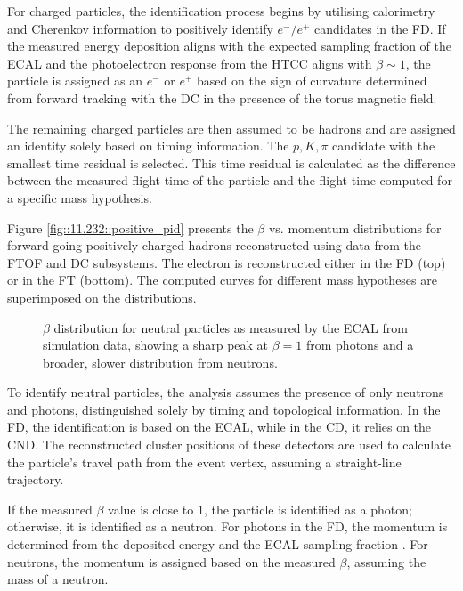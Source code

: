     For charged particles, the identification process begins by utilising calorimetry and Cherenkov information to positively identify $e^-/e^+$ candidates in the FD.
    If the measured energy deposition aligns with the expected sampling fraction of the ECAL and the photoelectron response from the HTCC aligns with $\beta \sim 1$, the particle is assigned as an $e^-$ or $e^+$ based on the sign of curvature determined from forward tracking with the DC in the presence of the torus magnetic field.

    The remaining charged particles are then assumed to be hadrons and are assigned an identity solely based on timing information.
    The $p, K, \pi$ candidate with the smallest time residual is selected.
    This time residual is calculated as the difference between the measured flight time of the particle and the flight time computed for a specific mass hypothesis.

    Figure \ref{fig::11.232::positive_pid} presents the $\beta$ vs. momentum distributions for forward-going positively charged hadrons reconstructed using data from the FTOF and DC subsystems.
    The electron is reconstructed either in the FD (top) or in the FT (bottom).
    The computed curves for different mass hypotheses are superimposed on the distributions.

    \begin{wrapfigure}{r}{0.50\textwidth}
        \caption[$\beta$ distribution of neutrals.]
        {$\beta$ distribution for neutral particles as measured by the ECAL from simulation data, showing a sharp peak at $\beta = 1$ from photons and a broader, slower distribution from neutrons.}
        \label{fig::11.232::neutrons_and_gamma}
    \end{wrapfigure}

    To identify neutral particles, the analysis assumes the presence of only neutrons and photons, distinguished solely by timing and topological information.
    In the FD, the identification is based on the ECAL, while in the CD, it relies on the CND.
    The reconstructed cluster positions of these detectors are used to calculate the particle's travel path from the event vertex, assuming a straight-line trajectory.

    If the measured $\beta$ value is close to $1$, the particle is identified as a photon; otherwise, it is identified as a neutron.
    For photons in the FD, the momentum is determined from the deposited energy and the ECAL sampling fraction \cite{asryan2020}.
    For neutrons, the momentum is assigned based on the measured $\beta$, assuming the mass of a neutron.

